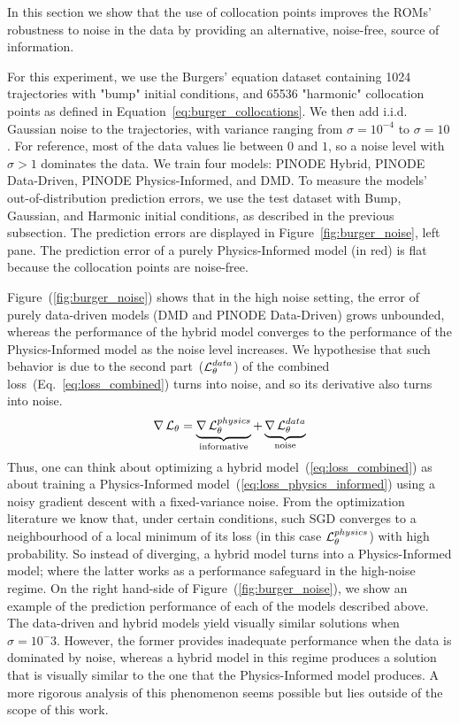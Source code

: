 In this section we show that the use of collocation points improves the ROMs' robustness to noise in the data by providing an alternative, noise-free, source of information.

For this experiment, we use the Burgers' equation dataset containing 1024 trajectories with "bump" initial conditions, and 65536 "harmonic" collocation points as defined in Equation~\ref{eq:burger_collocations}. We then add i.i.d. Gaussian noise to the trajectories, with variance ranging from $\sigma = 10^{-4}$ to $\sigma = 10$. For reference, most of the data values lie between $0$ and $1$, so a noise level with $\sigma > 1$ dominates the data. We train four models: PINODE Hybrid, PINODE Data-Driven, PINODE Physics-Informed, and DMD. To measure the models' out-of-distribution prediction errors, we use the test dataset with Bump, Gaussian, and Harmonic initial conditions, as described in the previous subsection. The prediction errors are displayed in Figure~\ref{fig:burger_noise}, left pane. The prediction error of a purely Physics-Informed model (in red) is flat because the collocation points are noise-free. 

Figure~(\ref{fig:burger_noise}) shows that in the high noise setting, the error of purely data-driven models (DMD and PINODE Data-Driven) grows unbounded, whereas the performance of the hybrid model converges to the performance of the Physics-Informed model as the noise level increases. We hypothesise that such behavior is due to the second part~($\operatorname{\mathcal{L}}_{\theta}^{data}$) of the combined loss~(Eq.~\ref{eq:loss_combined}) turns into noise, and so its derivative also turns into noise.
\begin{equation}
    \nabla \operatorname{\mathcal{L}}_{\theta} = \underbrace{\nabla\operatorname{\mathcal{L}}_{\theta}^{physics}}_{\text{informative}} + \underbrace{\nabla\operatorname{\mathcal{L}}_{\theta}^{data}}_{\text{noise}}
\end{equation}
Thus, one can think about optimizing a hybrid model~(\ref{eq:loss_combined}) as about training a Physics-Informed model~(\ref{eq:loss_physics_informed}) using a noisy gradient descent with a fixed-variance noise. From the optimization literature \cite{friedlander2012hybrid,patel2021global,shapiro2021lectures} we know that, under certain conditions, such SGD converges to a neighbourhood of a local minimum of its loss (in this case $\operatorname{\mathcal{L}}_{\theta}^{physics}$) with high probability. So instead of diverging, a hybrid model turns into a Physics-Informed model; where the latter works as a performance safeguard in the high-noise regime.  On the right hand-side of Figure~(\ref{fig:burger_noise}), we show an example of the prediction performance of each of the models described above. The data-driven and hybrid models yield visually similar solutions when $\sigma = 10^-3$. However, the former provides inadequate performance when the data is dominated by noise, whereas a hybrid model in this regime produces a solution that is visually similar to the one that the Physics-Informed model produces. A more rigorous analysis of this phenomenon seems possible but lies outside of the scope of this work.
